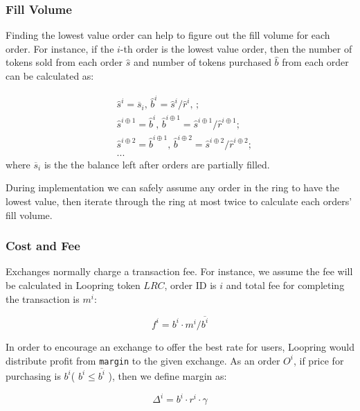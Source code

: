 \documentclass[UTF8,nofonts]{article}
\begin{document}
\subsubsection{Fill Volume\label{sec: matchquantity}}

Finding the lowest value order can help to figure out the fill volume for each order. For instance, if the $i$-th order is the lowest value order, then the number of tokens sold from each order $\hat{s}$ and number of tokens purchased $\hat{b}$ from each order can be calculated as:

\[
\begin{split}
&\hat{s}^{i}=\overline{s}_i\text{, } \hat{b}^{i}=\hat{s}^{i}/ \hat{r}^i\text{, }\text{;}\\
&\hat{s}^{i\oplus 1}=\hat{b}^i\text{, } \hat{b}^{i\oplus 1}=\hat{s}^{i\oplus 1}/ \hat{r}^{i\oplus 1}\text{;}\\
&\hat{s}^{i\oplus 2}=\hat{b}^{i\oplus 1}\text{, } \hat{b}^{i\oplus 2}=\hat{s}^{i\oplus 2}/ \hat{r}^{i\oplus 2}\text{;}\\
& ...
\end{split}
\]
where $\overline{s}_i$ is the the balance left after orders are partially filled.

During implementation we can safely assume any order in the ring to have the lowest value, then iterate through the ring at most twice to calculate each orders' fill volume. 

\subsubsection{Cost and Fee\label{sec: fee}}

Exchanges normally charge a transaction fee. For instance, we assume the fee will be calculated in Loopring token $LRC$, order ID is $i$ and total fee for completing the transaction is $m^i$: 

\begin{equation*}
f^i = b^i \cdot m^i / \overline{b^i}
\end{equation*}


In order to encourage an exchange to offer the best rate for users, Loopring would distribute profit from \texttt{margin} to the given exchange. As an order $O^i$,  if price for purchasing is $b^i$( $b^i \le \overline{b^i}$ ),  then we define margin as: 

\begin{equation*}
\Delta^i = b^i \cdot r^i \cdot \gamma
\end{equation*}
\end{document}
